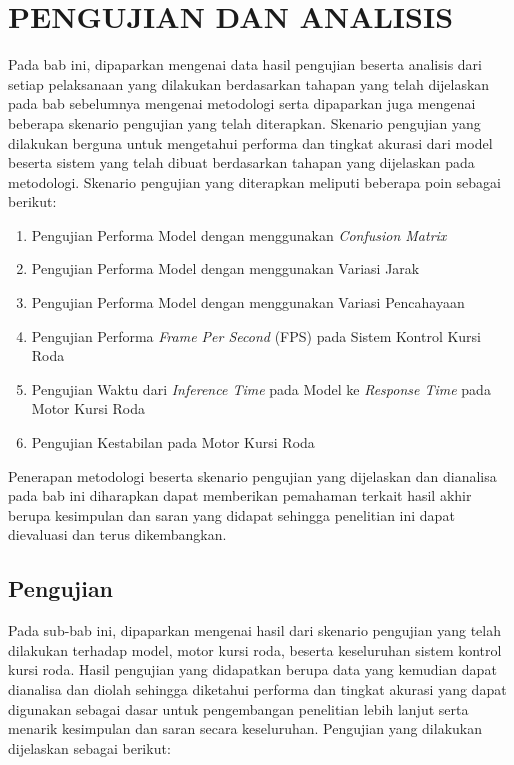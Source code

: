 \chapter{PENGUJIAN DAN ANALISIS}
\label{chap:pengujiananalisis}


Pada bab ini, dipaparkan mengenai data hasil pengujian beserta analisis dari setiap pelaksanaan yang dilakukan berdasarkan tahapan yang telah dijelaskan pada bab sebelumnya mengenai metodologi serta dipaparkan juga mengenai beberapa skenario pengujian yang telah diterapkan. Skenario pengujian yang dilakukan berguna untuk mengetahui performa dan tingkat akurasi dari model beserta sistem yang telah dibuat berdasarkan tahapan yang dijelaskan pada metodologi. Skenario pengujian yang diterapkan meliputi beberapa poin sebagai berikut:

\begin{enumerate}[topsep=8pt,itemsep=4pt,partopsep=4pt, parsep=4pt]
  \item Pengujian Performa Model dengan menggunakan \emph{Confusion Matrix}
  \item Pengujian Performa Model dengan menggunakan Variasi Jarak
  \item Pengujian Performa Model dengan menggunakan Variasi Pencahayaan
  \item Pengujian Performa \emph{Frame Per Second} (FPS) pada Sistem Kontrol Kursi Roda
  \item Pengujian Waktu dari \emph{Inference Time} pada Model ke \emph{Response Time} pada Motor Kursi Roda
  \item Pengujian Kestabilan pada Motor Kursi Roda
\end{enumerate}

Penerapan metodologi beserta skenario pengujian yang dijelaskan dan dianalisa pada bab ini diharapkan dapat memberikan pemahaman terkait hasil akhir berupa kesimpulan dan saran yang didapat sehingga penelitian ini dapat dievaluasi dan terus dikembangkan.

\section{Pengujian}
\label{sec:skenariopengujian}

Pada sub-bab ini, dipaparkan mengenai hasil dari skenario pengujian yang telah dilakukan terhadap model, motor kursi roda, beserta keseluruhan sistem kontrol kursi roda. Hasil pengujian yang didapatkan berupa data yang kemudian dapat dianalisa dan diolah sehingga diketahui performa dan tingkat akurasi yang dapat digunakan sebagai dasar untuk pengembangan penelitian lebih lanjut serta menarik kesimpulan dan saran secara keseluruhan. Pengujian yang dilakukan dijelaskan sebagai berikut:

